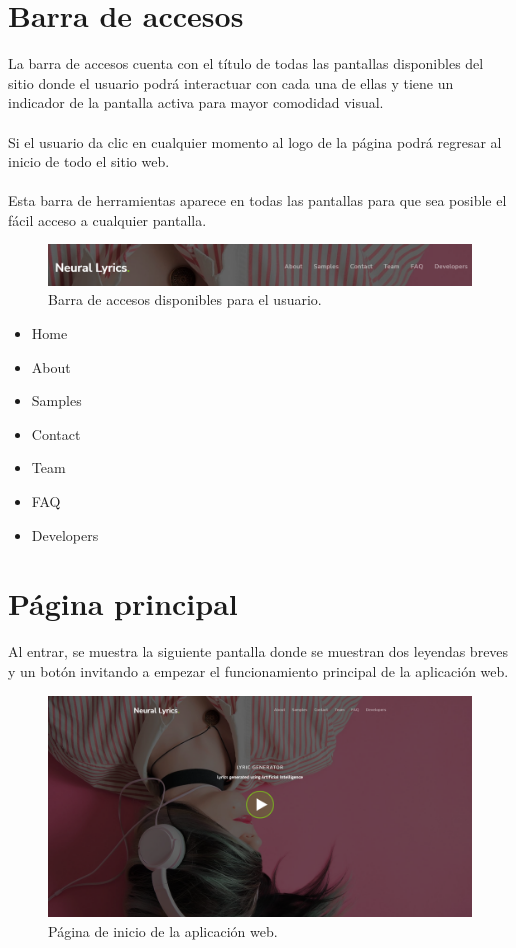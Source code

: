 \documentclass[12pt, a4paper, titlepage]{article}
\begin{document}
	\section{Barra de accesos}
	La barra de accesos cuenta con el título de todas las pantallas disponibles del sitio donde el usuario podrá interactuar con cada una de ellas y tiene un indicador de la pantalla activa para mayor comodidad visual.\\\\
	Si el usuario da clic en cualquier momento al logo de la página podrá regresar al inicio de todo el sitio web.\\\\
	Esta barra de herramientas aparece en todas las pantallas para que sea posible el fácil acceso a cualquier pantalla.
	
	\begin{figure}[H]
		\includegraphics[width=13.5cm]{./Imagenes/Capturas/pbarra.png}
		\centering \caption{Barra de accesos disponibles para el usuario.}
	\end{figure}
	\begin{itemize}
		\item Home
		\item About
		\item Samples
		\item Contact
		\item Team
		\item FAQ
		\item Developers
	\end{itemize}
	\section{Página principal}
	Al entrar, se muestra la siguiente pantalla donde se muestran dos leyendas breves y un botón invitando a empezar el funcionamiento principal de la aplicación web.
	\begin{figure}[H] 
		\includegraphics[width=13.5cm]{./Imagenes/Capturas/pprincipal.png}
		\centering \caption{Página de inicio de la aplicación web.}
	\end{figure}
\end{document}
